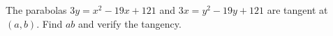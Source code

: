 The parabolas $3y=x^2-19x+121$ and $3x=y^2-19y+121$ are tangent at $(a,b)$. Find $ab$ and verify the tangency.
